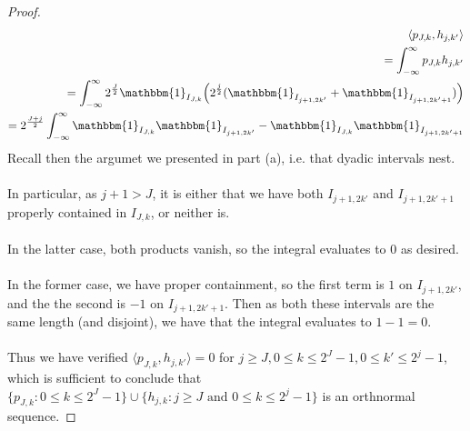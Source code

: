 \documentclass[12pt]{article}
\newenvironment{ex}[2][Exercise]{\begin{trivlist}
\item[\hskip \labelsep {\bfseries #1}\hskip \labelsep {\bfseries #2.}]}{\end{trivlist}}
\begin{document}
\begin{ex}{14}
\begin{enumerate}[label=(\alph*)]
\begin{proof}
\begin{align*}
                \langle p_{J,k}, h_{j, k'} \rangle \\
                = \int_{-\infty}^\infty p_{J,k}h_{j,k'} \\
                = \int_{-\infty}^\infty 2^{\frac{J}{2}}\mathbbm{1}_{I_{J,k}} \Big (2^{\frac{j}{2}}(\mathbbm{1}_{I_{j + 1, 2k'}} + \mathbbm{1}_{I_{j + 1, 2k' + 1}}) \Big) \\
                = 2^\frac{J + j}{2} \int_{-\infty}^\infty \mathbbm{1}_{I_{J, k}}\mathbbm{1}_{I_{j + 1, 2k'}} - \mathbbm{1}_{I_{J,k}}\mathbbm{1}_{I_{j + 1, 2k' + 1}}
            \end{align*}
            Recall then the argumet we presented in part (a), i.e. that dyadic intervals nest. \\ \\
            In particular, as $j + 1 > J$, it is either that we have both $I_{j + 1, 2k'}$ and $I_{j + 1, 2k' + 1}$ properly contained in $I_{J,k}$, or neither is. \\ \\
            In the latter case, both products vanish, so the integral evaluates to 0 as desired. \\ \\
            In the former case, we have proper containment, so the first term is $1$ on $I_{j + 1, 2k'}$, and the the second is $-1$ on $I_{j + 1, 2k' + 1}$. Then as both these intervals are the same length (and disjoint), we have that the integral evaluates to $1 - 1 = 0$. \\ \\
            Thus we have verified  $\langle p_{J,k}, h_{j,k'} \rangle = 0$ for $j \geq J, 0 \leq k \leq 2^J - 1, 0 \leq k' \leq 2^j - 1$, which is sufficient to conclude that $\{p_{J,k} : 0 \leq k \leq 2^J - 1\} \cup \{h_{j, k} : j \geq J \text{ and } 0 \leq k \leq 2^j - 1\}$ is an orthnormal sequence.


\end{proof}
\end{enumerate}
\end{ex}
\end{document}
